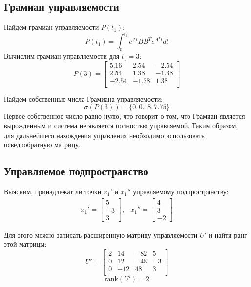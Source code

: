 \subsection{Грамиан управляемости}
Найдем грамиан управляемости $P(t_1)$:
\begin{equation}
    P(t_1) = \int_{0}^{t_1} e^{At}BB^Te^{A^Tt}dt
\end{equation}
Вычислим грамиан управляемости для $t_1 = 3$: 
\begin{equation}
    P(3) = \begin{bmatrix}
        5.16 & 2.54 & -2.54 \\ 
        2.54 & 1.38 & -1.38 \\ 
        -2.54 & -1.38 & 1.38 \\ 
    \end{bmatrix}
\end{equation}

Найдем собственные числа Грамиана управляемости:
\begin{equation}
   \sigma(P(3)) = \{0, 0.18, 7.75 \}
\end{equation}
Первое собственное число равно нулю, что говорит о том, что Грамиан является вырожденным и система не является полностью
управляемой. Таким образом, для дальнейшего нахождения управления необходимо использовать псведообратную матрицу. 

\subsection{Управляемое подпространство}
Выясним, принадлежат ли точки $x_1'$ и $x_1''$ управляемому подпространству:
\begin{equation}
    \begin{array}{cc}
        x_1' = \begin{bmatrix}
            5 \\
            -3 \\
            3
        \end{bmatrix}, &
        x_1'' = \begin{bmatrix}
            4 \\
            3 \\
            -2
        \end{bmatrix}
    \end{array}
\end{equation}

Для этого можно записать расширенную матрицу управляемости $U'$ и найти ранг этой матрицы:
\begin{equation}
    U' = \begin{bmatrix}
        2 & 14 & -82 & 5\\ 
        0 & 12 & -48 & -3\\ 
        0 & -12 & 48 & 3\\
    \end{bmatrix}
\end{equation}
\begin{equation}
    \text{rank}(U') = 2
\end{equation}

